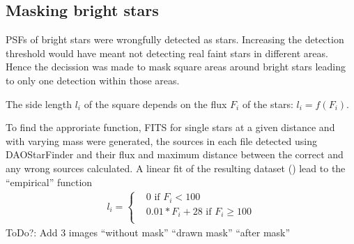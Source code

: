 \documentclass[letterpaper,10pt,english]{sphinxmanual}
\begin{document}
\subsection{Masking bright stars}
\label{\detokenize{NBodySimulation/DataReduction:masking-bright-stars}}\label{\detokenize{NBodySimulation/DataReduction:masking-bright-stars-label}}
\sphinxAtStartPar
PSFs of bright stars were wrongfully detected as stars. Increasing the detection threshold would have meant not detecting real faint stars in different areas.
Hence the decission was made to mask square areas around bright stars leading to only one detection within those areas.

\sphinxAtStartPar
The side length \(l_i\) of the square depends on the flux \(F_i\) of the stars: \(l_i = f(F_i)\).

\sphinxAtStartPar
To find the approriate function, FITS for single stars at a given distance and with varying mass were generated,
the sources in each file detected using DAOStarFinder and their flux and maximum distance between the correct and any wrong sources calculated.
A linear fit of the resulting dataset ({\hyperref[\detokenize{NBodySimulation/Appendix:appendix-label}]{}}) lead to the “empirical” function
\begin{equation}\label{equation:NBodySimulation/DataReduction:side_length}
\begin{split}l_i = \begin{cases}
 & 0\text{ if } F_i < 100\\
 & 0.01*F_i+28\text{ if } F_i \geqslant 100\\
\end{cases}\end{split}
\end{equation}
\sphinxAtStartPar
ToDo?: Add 3 images “without mask” “drawn mask” “after mask”
\end{document}
